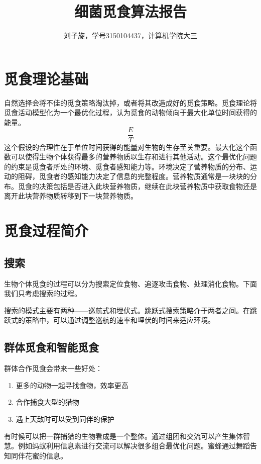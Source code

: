 \documentclass{article}
\title{细菌觅食算法报告}
\author{刘子旋，学号3150104437，计算机学院大三}
\begin{document}
\maketitle
\newpage
\tableofcontents
\newpage

\section{觅食理论基础}
自然选择会将不佳的觅食策略淘汰掉，或者将其改造成好的觅食策略。觅食理论将觅食活动模型化为一个最优化过程，认为觅食的动物倾向于最大化单位时间获得的能量。
\begin{equation*}
    \frac{E}{T}
\end{equation*}
这个假设的合理性在于单位时间获得的能量对生物的生存至关重要。最大化这个函数可以使得生物个体获得最多的营养物质以生存和进行其他活动。这个最优化问题的约束是觅食者所处的环境、觅食者感知能力等。环境决定了营养物质的分布、运动的阻碍，觅食者的感知能力决定了信息的完整程度。营养物质通常是一块块的分布。觅食的决策包括是否进入此块营养物质，继续在此块营养物质中获取食物还是离开此块营养物质转移到下一块营养物质。

\section{觅食过程简介}
\subsection{搜索}
生物个体觅食的过程可以分为搜索定位食物、追逐攻击食物、处理消化食物。下面我们只考虑搜索的过程。

搜索的模式主要有两种——巡航式和埋伏式。跳跃式搜索策略介于两者之间。在跳跃式的策略中，可以通过调整巡航的速率和埋伏的时间来适应环境。

\subsection{群体觅食和智能觅食}
群体合作觅食会带来一些好处：
\begin{enumerate}
    \item 更多的动物一起寻找食物，效率更高
    \item 合作捕食大型的猎物
    \item 遇上天敌时可以受到同伴的保护
\end{enumerate}

有时候可以把一群捕猎的生物看成是一个整体。通过组团和交流可以产生集体智慧。例如蚂蚁利用信息素进行交流可以解决很多组合最优化问题。蜜蜂通过舞蹈告知同伴花蜜的信息。
\end{document}
